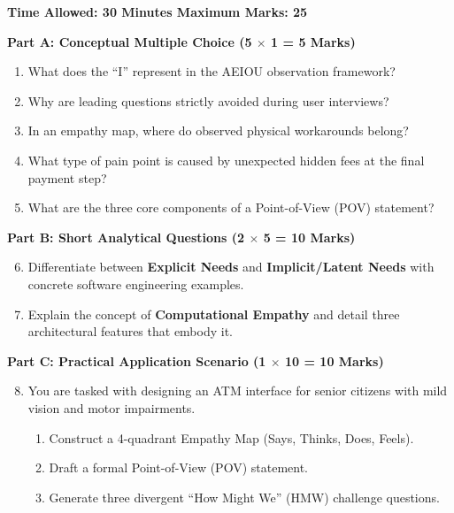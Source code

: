 \begin{chaptertest}
\textbf{Time Allowed: 30 Minutes \hfill Maximum Marks: 25}

\vspace{0.4cm}
\noindent\textbf{Part A: Conceptual Multiple Choice (5 $\times$ 1 = 5 Marks)}
\begin{enumerate}[leftmargin=1.2em, itemsep=2pt]
    \item What does the ``I'' represent in the AEIOU observation framework?
    \item Why are leading questions strictly avoided during user interviews?
    \item In an empathy map, where do observed physical workarounds belong?
    \item What type of pain point is caused by unexpected hidden fees at the final payment step?
    \item What are the three core components of a Point-of-View (POV) statement?
\end{enumerate}

\vspace{0.3cm}
\noindent\textbf{Part B: Short Analytical Questions (2 $\times$ 5 = 10 Marks)}
\begin{enumerate}[leftmargin=1.2em, itemsep=4pt]
    \setcounter{enumi}{5}
    \item Differentiate between \textbf{Explicit Needs} and \textbf{Implicit/Latent Needs} with concrete software engineering examples.
    \item Explain the concept of \textbf{Computational Empathy} and detail three architectural features that embody it.
\end{enumerate}

\vspace{0.3cm}
\noindent\textbf{Part C: Practical Application Scenario (1 $\times$ 10 = 10 Marks)}
\begin{enumerate}[leftmargin=1.2em, itemsep=4pt]
    \setcounter{enumi}{7}
    \item You are tasked with designing an ATM interface for senior citizens with mild vision and motor impairments.
    \begin{enumerate}[label=(\alph*)]
        \item Construct a 4-quadrant Empathy Map (Says, Thinks, Does, Feels).
        \item Draft a formal Point-of-View (POV) statement.
        \item Generate three divergent ``How Might We'' (HMW) challenge questions.
    \end{enumerate}
\end{enumerate}
\end{chaptertest}

